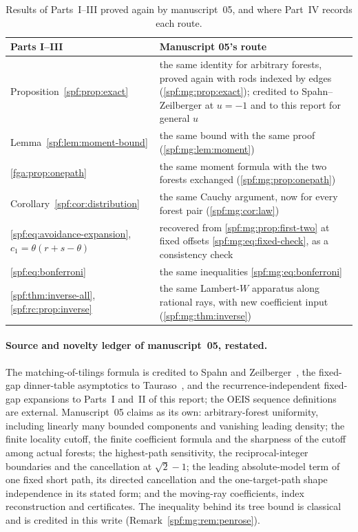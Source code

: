 \documentclass[11pt]{article}
\numberwithin{equation}{section}
\theoremstyle{definition}
\theoremstyle{remark}
\theoremstyle{definition}
\begin{document}
\begin{table}[htbp]
\centering\small
\renewcommand{\arraystretch}{1.12}
\begin{tabular}{@{}>{\raggedright\arraybackslash}p{}>{\raggedright\arraybackslash}p{}@{}}
\toprule
Parts I--III & Manuscript 05's route\\
\midrule
Proposition~\ref{spf:prop:exact} &
the same identity for arbitrary forests, proved again with rods indexed by
edges (\cref{spf:mg:prop:exact}); credited to Spahn--Zeilberger at $u=-1$
and to this report for general $u$\\
Lemma~\ref{spf:lem:moment-bound} &
the same bound with the same proof (\cref{spf:mg:lem:moment})\\
\cref{fga:prop:onepath} &
the same moment formula with the two forests exchanged
(\cref{spf:mg:prop:onepath})\\
Corollary~\ref{spf:cor:distribution} &
the same Cauchy argument, now for every forest pair
(\cref{spf:mg:cor:law})\\
\eqref{spf:eq:avoidance-expansion}, $c_1=\theta(r+s-\theta)$ &
recovered from \cref{spf:mg:prop:first-two} at fixed offsets
\eqref{spf:mg:eq:fixed-check}, as a consistency check\\
\eqref{spf:eq:bonferroni} &
the same inequalities \eqref{spf:mg:eq:bonferroni}\\
\cref{spf:thm:inverse-all}, \cref{spf:rc:prop:inverse} &
the same Lambert-$W$ apparatus along rational rays, with new coefficient
input (\cref{spf:mg:thm:inverse})\\
\bottomrule
\end{tabular}
\caption{Results of Parts~I--III proved again by manuscript~05, and where
Part~IV records each route.}
\label{spf:mg:tab:routes}
\end{table}

\paragraph{Source and novelty ledger of manuscript~05, restated.}
The matching-of-tilings formula is credited to Spahn and
Zeilberger~\cite{spahn}, the fixed-gap dinner-table asymptotics to
Tauraso~\cite{tauraso}, and the recurrence-independent fixed-gap expansions
to Parts~I and~II of this report; the OEIS sequence definitions are external.
Manuscript~05 claims as its own: arbitrary-forest uniformity, including
linearly many bounded components and vanishing leading density; the finite
locality cutoff, the finite coefficient formula and the sharpness of the
cutoff among actual forests; the highest-path sensitivity, the
reciprocal-integer boundaries and the cancellation at $\sqrt2-1$; the
leading absolute-model term of one fixed short path, its directed
cancellation and the one-target-path shape independence in its stated form;
and the moving-ray coefficients, index reconstruction and certificates. The
inequality behind its tree bound is classical and is credited in this write
(Remark~\ref{spf:mg:rem:penrose}).
\end{document}

